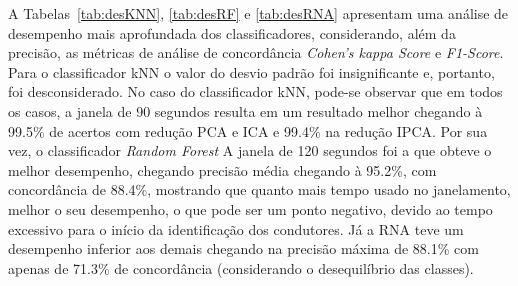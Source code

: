 A Tabelas~\ref{tab:desKNN}, \ref{tab:desRF} e \ref{tab:desRNA} apresentam uma análise de desempenho mais aprofundada dos classificadores, considerando, além da precisão, as métricas de análise de concordância \textit{Cohen's kappa Score} e \textit{F1-Score}. Para o classificador kNN o valor do desvio padrão foi insignificante e, portanto, foi desconsiderado. No caso do classificador kNN, pode-se observar que em todos os casos, a janela de 90 segundos resulta em um resultado melhor chegando à 99.5\% de acertos com redução PCA e ICA e 99.4\% na redução IPCA. Por sua vez, o classificador \textit{Random Forest} A janela de 120 segundos foi a que obteve o melhor desempenho, chegando precisão média chegando à 95.2\%, com concordância de 88.4\%, mostrando que quanto mais tempo usado no janelamento, melhor o seu desempenho, o que pode ser um ponto negativo, devido ao tempo excessivo para o início da identificação dos condutores. Já a RNA teve um desempenho inferior aos demais chegando na precisão máxima de 88.1\% com apenas de 71.3\% de concordância (considerando o desequilíbrio das classes).

\begin{table}[!htb]
	\centering
	\caption{Desempenho do Classificador KNN e Técnicas de Redução de Dimensionalidade em diferentes métricas}
	\label{tab:desKNN}
\end{table}


